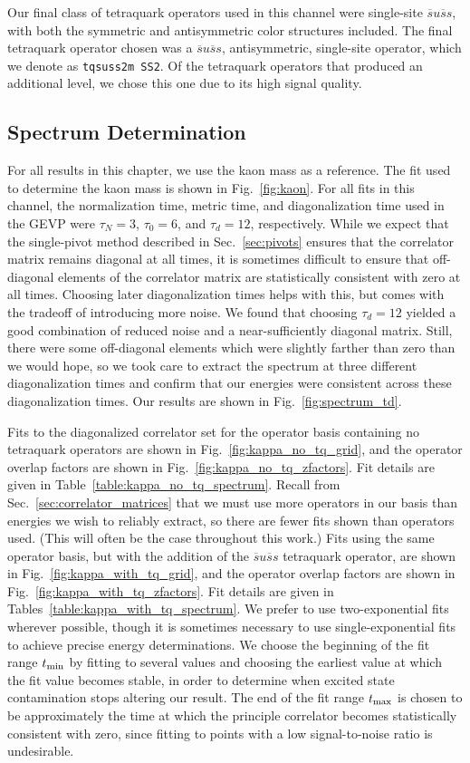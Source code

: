 Our final class of tetraquark operators used in this channel were single-site $\overline s u \overline s s$, with both the symmetric and antisymmetric color structures included. The final tetraquark operator chosen was a $\overline s u \overline s s$, antisymmetric, single-site operator, which we denote as \verb+tqsuss2m SS2+. Of the tetraquark operators that produced an additional level, we chose this one due to its high signal quality.
\subsection{Spectrum Determination}
For all results in this chapter, we use the kaon mass as a reference. The fit used to determine the kaon mass is shown in Fig.~\ref{fig:kaon}. For all fits in this channel, the normalization time, metric time, and diagonalization time used in the GEVP were $\tau_N=3$, $\tau_0=6$, and $\tau_d=12$, respectively. While we expect that the single-pivot method described in Sec.~\ref{sec:pivots} ensures that the correlator matrix remains diagonal at all times, it is sometimes difficult to ensure that off-diagonal elements of the correlator matrix are statistically consistent with zero at all times. Choosing later diagonalization times helps with this, but comes with the tradeoff of introducing more noise. We found that choosing $\tau_d=12$ yielded a good combination of reduced noise and a near-sufficiently diagonal matrix. Still, there were some off-diagonal elements which were slightly farther than zero than we would hope, so we took care to extract the spectrum at three different diagonalization times and confirm that our energies were consistent across these diagonalization times. Our results are shown in Fig.~\ref{fig:spectrum_td}.

Fits to the diagonalized correlator set for the operator basis containing no tetraquark operators are shown in Fig.~\ref{fig:kappa_no_tq_grid}, and the operator overlap factors are shown in Fig.~\ref{fig:kappa_no_tq_zfactors}. Fit details are given in Table~\ref{table:kappa_no_tq_spectrum}. Recall from Sec.~\ref{sec:correlator_matrices} that we must use more operators in our basis than energies we wish to reliably extract, so there are fewer fits shown than operators used. (This will often be the case throughout this work.) Fits using the same operator basis, but with the addition of the $\overline s u \overline s s$ tetraquark operator, are shown in Fig.~\ref{fig:kappa_with_tq_grid}, and the operator overlap factors are shown in Fig.~\ref{fig:kappa_with_tq_zfactors}. Fit details are given in Tables~\ref{table:kappa_with_tq_spectrum}. We prefer to use two-exponential fits wherever possible, though it is sometimes necessary to use single-exponential fits to achieve precise energy determinations. We choose the beginning of the fit range $t_{\rm{min}}$ by fitting to several values and choosing the earliest value at which the fit value becomes stable, in order to determine when excited state contamination stops altering our result. The end of the fit range $t_{\rm{max}}$ is chosen to be approximately the time at which the principle correlator becomes statistically consistent with zero, since fitting to points with a low signal-to-noise ratio is undesirable.

